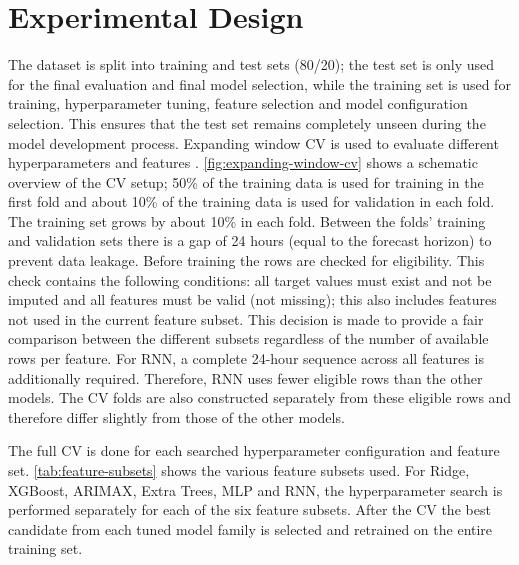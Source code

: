 \section{Experimental Design}
\label{sec:experimental-design}
The dataset is split into training and test sets (80/20); the test set is only used for the final evaluation and final model selection, while the training set is used for training, hyperparameter tuning, feature selection and model configuration selection. This ensures that the test set remains completely unseen during the model development process. Expanding window \ac{CV} is used to evaluate different hyperparameters and features \cite{hewamalageForecastEvaluationData2023}. \autoref{fig:expanding-window-cv} shows a schematic overview of the \ac{CV} setup; 50\% of the training data is used for training in the first fold and about 10\% of the training data is used for validation in each fold. The training set grows by about 10\% in each fold. Between the folds' training and validation sets there is a gap of 24 hours (equal to the forecast horizon) to prevent data leakage. Before training the rows are checked for eligibility. This check contains the following conditions: all target values must exist and not be imputed and all features must be valid (not missing); this also includes features not used in the current feature subset. This decision is made to provide a fair comparison between the different subsets regardless of the number of available rows per feature.
For \ac{RNN}, a complete 24-hour sequence across all features is additionally required. Therefore, \ac{RNN} uses fewer eligible rows than the other models. The \ac{CV} folds are also constructed separately from these eligible rows and therefore differ slightly from those of the other models.


The full \ac{CV} is done for each searched hyperparameter configuration and feature set. \autoref{tab:feature-subsets} shows the various feature subsets used. For Ridge, XGBoost, \ac{ARIMAX}, Extra Trees, \ac{MLP} and \ac{RNN}, the hyperparameter search is performed separately for each of the six feature subsets. After the \ac{CV} the best candidate from each tuned model family is selected and retrained on the entire training set.

